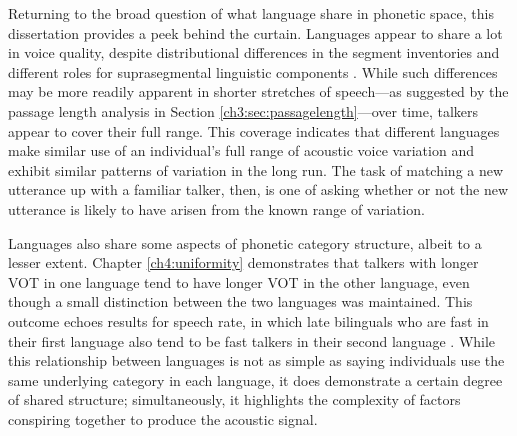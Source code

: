 Returning to the broad question of what language share in phonetic space, this dissertation provides a peek behind the curtain. Languages appear to share a lot in voice quality, despite distributional differences in the segment inventories and different roles for suprasegmental linguistic components \citep{matthews_2013_cantonese}. While such differences may be more readily apparent in shorter stretches of speech---as suggested by the passage length analysis in Section \ref{ch3:sec:passagelength}---over time, talkers appear to cover their full range. This coverage indicates that different languages make similar use of an individual's full range of acoustic voice variation and exhibit similar patterns of variation in the long run. The task of matching a new utterance up with a familiar talker, then, is one of asking whether or not the new utterance is likely to have arisen from the known range of variation.

Languages also share some aspects of phonetic category structure, albeit to a lesser extent. Chapter \ref{ch4:uniformity} demonstrates that talkers with longer VOT in one language tend to have longer VOT in the other language, even though a small distinction between the two languages was maintained. This outcome echoes results for speech rate, in which late bilinguals who are fast in their first language also tend to be fast talkers in their second language \citep{bradlow_2017_rate}. While this relationship between languages is not as simple as saying individuals use the same underlying category in each language, it does demonstrate a certain degree of shared structure; simultaneously, it highlights the complexity of factors conspiring together to produce the acoustic signal. 


